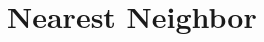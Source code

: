\chapter{Nearest Neighbor}

\begin{ex}
\end{ex}

\begin{ex}
\end{ex}

\begin{ex}
\end{ex}

\begin{ex}
\end{ex}